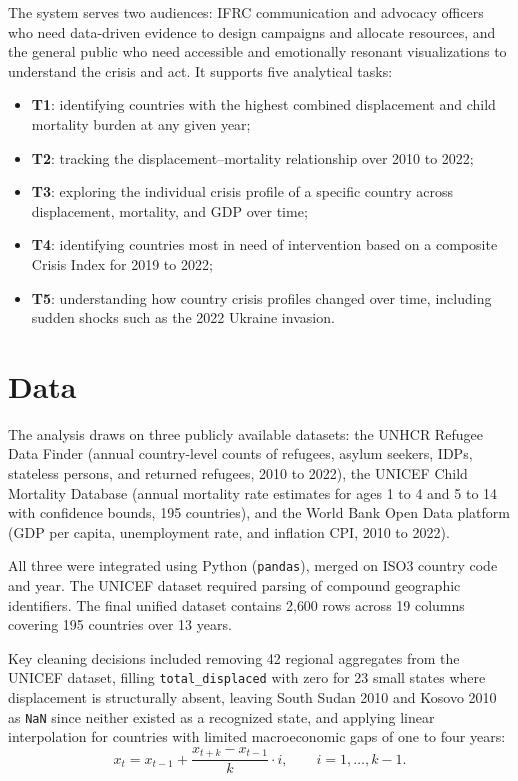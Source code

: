 \documentclass{article}
\begin{document}
The system serves two audiences: IFRC communication and advocacy officers who need data-driven evidence to design campaigns and allocate resources, and the general public who need accessible and emotionally resonant visualizations to understand the crisis and act. It supports five analytical tasks:

\begin{itemize}[leftmargin=2em,itemsep=2pt]
  \item \textbf{T1}: identifying countries with the highest combined displacement and child mortality burden at any given year;
  \item \textbf{T2}: tracking the displacement--mortality relationship over 2010 to 2022;
  \item \textbf{T3}: exploring the individual crisis profile of a specific country across displacement, mortality, and GDP over time;
  \item \textbf{T4}: identifying countries most in need of intervention based on a composite Crisis Index for 2019 to 2022;
  \item \textbf{T5}: understanding how country crisis profiles changed over time, including sudden shocks such as the 2022 Ukraine invasion.
\end{itemize}

\section{Data}

The analysis draws on three publicly available datasets: the UNHCR Refugee Data Finder (annual country-level counts of refugees, asylum seekers, IDPs, stateless persons, and returned refugees, 2010 to 2022), the UNICEF Child Mortality Database (annual mortality rate estimates for ages 1 to 4 and 5 to 14 with confidence bounds, 195 countries), and the World Bank Open Data platform (GDP per capita, unemployment rate, and inflation CPI, 2010 to 2022).

All three were integrated using Python (\texttt{pandas}), merged on ISO3 country code and year. The UNICEF dataset required parsing of compound geographic identifiers. The final unified dataset contains 2{,}600 rows across 19 columns covering 195 countries over 13 years.

Key cleaning decisions included removing 42 regional aggregates from the UNICEF dataset, filling \texttt{total\_displaced} with zero for 23 small states where displacement is structurally absent, leaving South Sudan 2010 and Kosovo 2010 as \texttt{NaN} since neither existed as a recognized state, and applying linear interpolation for countries with limited macroeconomic gaps of one to four years:
\begin{equation}
x_t = x_{t-1} + \frac{x_{t+k} - x_{t-1}}{k}\cdot i,
\qquad i = 1, \ldots, k-1.
\end{equation}
\end{document}
